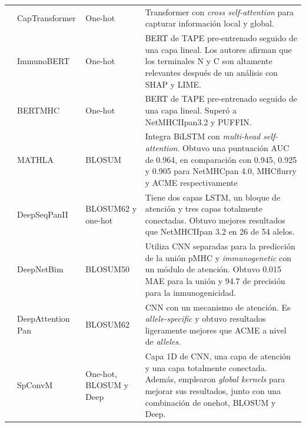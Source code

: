 \begin{table}[ht]
{\begin{scriptsize}
\begin{tabular}{p{2.5cm}p{2.5cm}p{2cm}p{5.5cm}}
			\cite{chen2021jointly}  & CapTransformer            & One-hot   &  Transformer con \textit{cross self-attention} para capturar información local y global.  \\
			
			\cite{gasser2021interpreting}  & ImmunoBERT            & One-hot                     & BERT de TAPE pre-entrenado seguido de una capa lineal. Los autores afirman que los terminales N y C son altamente relevantes después de un análisis con SHAP y LIME.   \\
			
			\cite{cheng2021bertmhc}             & BERTMHC              & One-hot                    & BERT de TAPE pre-entrenado seguido de una capa lineal. Superó a NetMHCIIpan3.2 y PUFFIN.   \\
			
			\cite{ye2021mathla}         & MATHLA             & BLOSUM                      & 
			Integra BiLSTM con \textit{multi-head self-attention}. Obtuvo una puntuación AUC de 0.964, en comparación con 0.945, 0.925 y 0.905 para NetMHCpan 4.0, MHCflurry y ACME respectivamente  \\
			
			\cite{liu2021deepseqpanii}                    & DeepSeqPanII                            & BLOSUM62 y one-hot& Tiene dos capas LSTM, un bloque de atención y tres capas totalmente conectadas. Obtuvo mejores resultados que NetMHCIIpan 3.2 en 26 de 54 alelos.       \\
			
			\cite{yang2021deepnetbim}  & DeepNetBim               & BLOSUM50            & Utiliza CNN separadas para la predicción de la unión pMHC y \textit{immunogenetic} con un módulo de atención. Obtuvo 0.015 MAE para la unión y 94.7 de precisión para la inmunogenicidad.      \\
			
			\cite{jin2021deep}         & DeepAttention Pan        & BLOSUM62            & CNN con un mecanismo de atención. Es \textit{allele-specific} y obtuvo resultados ligeramente mejores que ACME a nivel de \textit{alleles}.     \\
			
			\cite{chen2021ranking}  & SpConvM            &  One-hot, BLOSUM y Deep                     &  Capa 1D de CNN, una capa de atención y una capa totalmente conectada. Además, emplearon \textit{global kernels} para mejorar sus resultados, junto con una combinación de onehot, BLOSUM y Deep.  \\
			

\end{tabular}
\end{scriptsize}}
\end{table}
